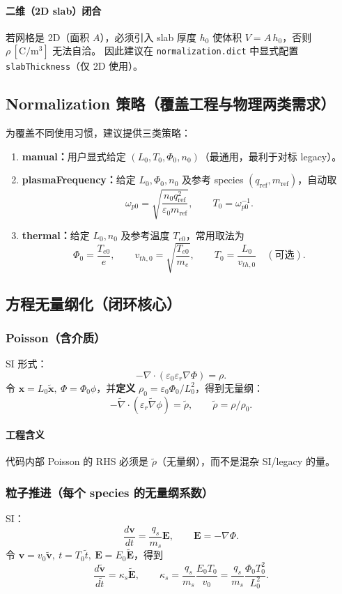 \documentclass[11pt,a4paper]{ctexart}
\begin{document}
\paragraph{二维（2D slab）闭合}
若网格是 2D（面积 $A$），必须引入 slab 厚度 $h_0$ 使体积 $V=A\,h_0$，否则 $\rho\,[\mathrm{C/m^3}]$ 无法自洽。
因此建议在 \texttt{normalization.dict} 中显式配置 \texttt{slabThickness}（仅 2D 使用）。

\subsection{Normalization 策略（覆盖工程与物理两类需求）}
为覆盖不同使用习惯，建议提供三类策略：
\begin{enumerate}[leftmargin=2em]
\item \textbf{manual：}用户显式给定 $(L_0,T_0,\Phi_0,n_0)$（最通用，最利于对标 legacy）。
\item \textbf{plasmaFrequency：}给定 $L_0,\Phi_0,n_0$ 及参考 species $(q_{\mathrm{ref}},m_{\mathrm{ref}})$，自动取
\[
\omega_{p0}=\sqrt{\frac{n_0 q_{\mathrm{ref}}^2}{\varepsilon_0 m_{\mathrm{ref}}}},\qquad T_0=\omega_{p0}^{-1}.
\]
\item \textbf{thermal：}给定 $L_0,n_0$ 及参考温度 $T_{e0}$，常用取法为
\[
\Phi_0=\frac{T_{e0}}{e},\qquad v_{th,0}=\sqrt{\frac{T_{e0}}{m_e}},\qquad T_0=\frac{L_0}{v_{th,0}}\quad(\text{可选}).
\]
\end{enumerate}

\subsection{方程无量纲化（闭环核心）}
\subsubsection{Poisson（含介质）}
SI 形式：
\[
-\nabla\cdot(\varepsilon_0\varepsilon_r\nabla \Phi)=\rho.
\]
令 $\bm{x}=L_0\tilde{\bm{x}},\ \Phi=\Phi_0\phi$，并\textbf{定义} $\rho_0=\varepsilon_0\Phi_0/L_0^2$，得到无量纲：
\[
-\tilde{\nabla}\cdot(\varepsilon_r\tilde{\nabla}\phi)=\tilde{\rho},\qquad \tilde{\rho}=\rho/\rho_0.
\]
\paragraph{工程含义}
代码内部 Poisson 的 RHS 必须是 $\tilde{\rho}$（无量纲），而不是混杂 SI/legacy 的量。

\subsubsection{粒子推进（每个 species 的无量纲系数）}
SI：
\[
\frac{d\bm{v}}{dt}=\frac{q_s}{m_s}\bm{E},\qquad \bm{E}=-\nabla\Phi.
\]
令 $\bm{v}=v_0\tilde{\bm{v}},\ t=T_0\tilde{t},\ \bm{E}=E_0\tilde{\bm{E}}$，得到
\[
\frac{d\tilde{\bm{v}}}{d\tilde{t}}=\kappa_s\tilde{\bm{E}},\qquad
\kappa_s=\frac{q_s}{m_s}\frac{E_0T_0}{v_0}=\frac{q_s}{m_s}\frac{\Phi_0T_0^2}{L_0^2}.
\]
\end{document}
